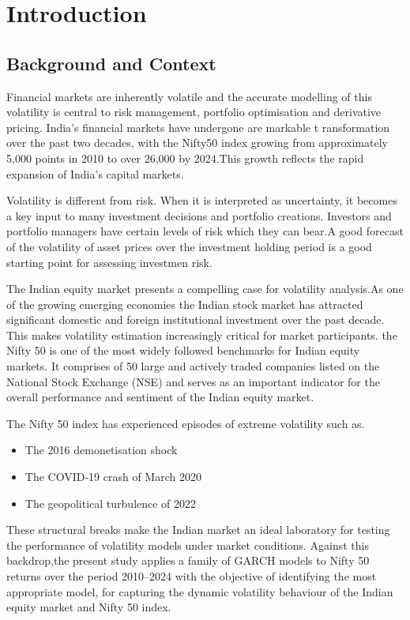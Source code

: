 \chapter{Introduction}
\section{Background and Context}
Financial markets are inherently volatile and the accurate modelling of this volatility is central to risk management, portfolio optimisation and derivative pricing. India’s financial markets have undergone are markable t ransformation over the past two decades, with the Nifty50 index growing from approximately 5,000 points in 2010 to over 26,000 by 2024.This growth reflects the rapid expansion of India’s capital markets.

Volatility is different from risk. When it is interpreted as uncertainty, it becomes a key input to many investment decisions and portfolio creations. Investors and portfolio managers have certain levels of risk which they can bear.A good forecast of the volatility of asset prices over the investment holding period is a good starting point for assessing investmen risk\citep{poon2003}.

The Indian equity market presents a compelling case for volatility analysis.As one of the growing emerging economies the Indian stock market has attracted significant domestic and foreign institutional investment over the past decade. This makes volatility estimation increasingly critical for market participants. the Nifty 50 is one of the most widely followed benchmarks for Indian equity markets. It comprises of 50 large and actively traded companies listed on the National Stock Exchange (NSE) and serves as an important indicator for the overall performance and sentiment of the Indian equity market.


The Nifty 50 index has experienced episodes of extreme volatility such as.
\begin{itemize}
 \item The 2016 demonetisation shock

 \item The COVID-19 crash of March 2020

 \item The geopolitical turbulence of 2022
\end{itemize}


These structural breaks make the Indian market an ideal laboratory for testing the performance of volatility models under market conditions. Against this backdrop,the present study
applies a family of GARCH models to Nifty 50 returns over the period 2010--2024 with the objective of identifying the most appropriate model, for capturing the dynamic volatility
behaviour of the Indian equity market and Nifty 50 index.
\vspace{2cm}




